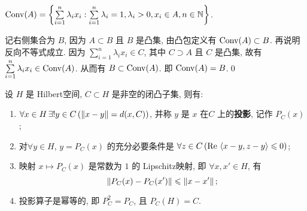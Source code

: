     \begin{Proposition}
        $ \operatorname{Conv}(A)=\left\{ \sum\limits_{i=1}^{n}\lambda_{i}x_{i}:\sum\limits_{i=1}^{n}\lambda_{i}=1, \lambda_{i}>0, x_{i}\in A, n\in \mathbb{N} \right\} $. 
    \end{Proposition}
    
    \begin{Proof}
        记右侧集合为 $ B $, 因为 $ A\subset B $ 且 $ B $ 是凸集, 由凸包定义有 $ \operatorname{Conv}(A)\subset B $. 再说明反向不等式成立. 因为 $ \sum\limits_{i=1}^{n}\lambda_{i}x_{i}\in C $, 其中 $ C\supset A $ 且 $ C $ 是凸集, 故有 $ \sum\limits_{i=1}^{n}\lambda_{i}x_{i}\in\operatorname{Conv}(A) $. 从而有 $ B\subset\operatorname{Conv}(A) $. 即 $ \operatorname{Conv}(A)=B $.\qed
    \end{Proof}

    \begin{Theorem}[闭凸集投影定理]\label{thm:闭凸集投影定理}
        设 $ H $ 是 Hilbert空间, $ C\subset H $ 是非空的闭凸子集, 则有:
        \begin{enumerate}[(1)]
            \item $ \forall x\in H\,\exists!y\in C\,(\left\| x-y \right\|=d(x, C)) $, 并称 $ y $ 是 $ x $ 在$ C $ 上的\textbf{投影}, 记作 $ P_{C}(x) $;
            \item 对$ \forall y\in H $, $ y=P_{C}(x) $ 的充分必要条件是 $ \forall z\in C\,(\mathrm{Re\,}\left\langle x-y, z-y \right\rangle\leqslant0) $;
            \item 映射 $ x\mapsto P_{C}(x) $ 是常数为 $ 1 $ 的 Lipschitz映射, 即 $ \forall x, x'\in H $, 有
            \[
                \left\| P_{C}(x)-P_{C}(x') \right\|\leqslant \left\| x-x' \right\|;
            \]
            \item 投影算子是幂等的, 即 $ P^{2}_{C}=P_{C} $, 且 $ P_{C}(H)=C $. 
        \end{enumerate}
    \end{Theorem}
    
